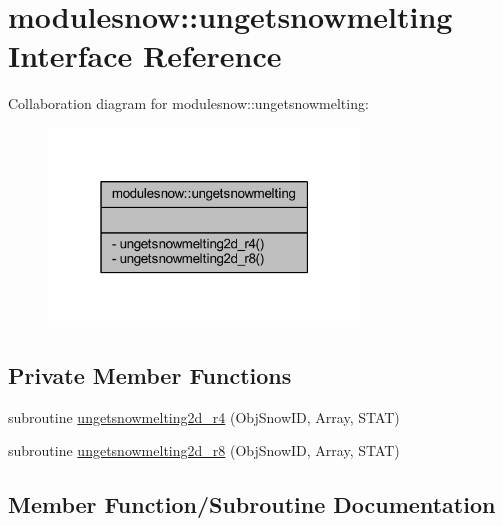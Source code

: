 \hypertarget{interfacemodulesnow_1_1ungetsnowmelting}{}\section{modulesnow\+:\+:ungetsnowmelting Interface Reference}
\label{interfacemodulesnow_1_1ungetsnowmelting}


Collaboration diagram for modulesnow\+:\+:ungetsnowmelting\+:\nopagebreak
\begin{figure}[H]
\begin{center}
\leavevmode
\includegraphics[width=235pt]{interfacemodulesnow_1_1ungetsnowmelting__coll__graph}
\end{center}
\end{figure}
\subsection*{Private Member Functions}
\begin{DoxyCompactItemize}
\item 
subroutine \mbox{\hyperlink{interfacemodulesnow_1_1ungetsnowmelting_a8cc3f2187ed135b167d9761f21a342c6}{ungetsnowmelting2d\+\_\+r4}} (Obj\+Snow\+ID, Array, S\+T\+AT)
\item 
subroutine \mbox{\hyperlink{interfacemodulesnow_1_1ungetsnowmelting_ae7674e5a6a085c0e73335197a78b010d}{ungetsnowmelting2d\+\_\+r8}} (Obj\+Snow\+ID, Array, S\+T\+AT)
\end{DoxyCompactItemize}


\subsection{Member Function/\+Subroutine Documentation}
\mbox{\label{interfacemodulesnow_1_1ungetsnowmelting_a8cc3f2187ed135b167d9761f21a342c6}} 
